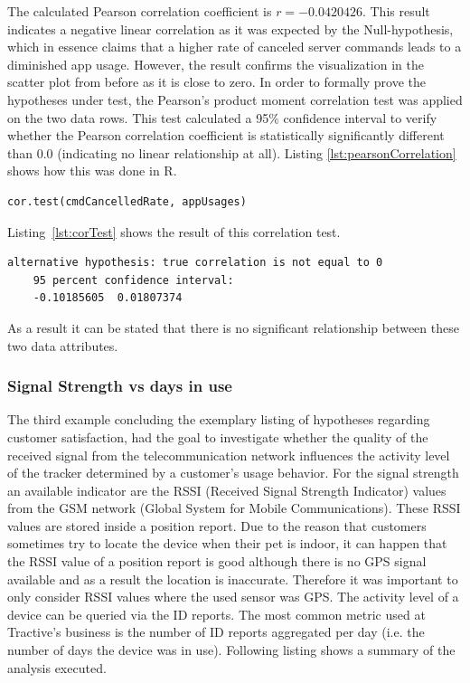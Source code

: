 \begin{enumerate}
	The calculated Pearson correlation coefficient is $r = -0.0420426$. 
	This result indicates a negative linear correlation as it was expected by the Null-hypothesis, which in essence claims that a higher rate of canceled server commands leads to a diminished app usage. However, the result confirms the visualization in the scatter plot from before as it is close to zero.
	In order to formally prove the hypotheses under test, the Pearson's product moment correlation test was applied on the two data rows. This test calculated a 95\% confidence interval to verify whether the Pearson correlation coefficient is statistically significantly different than $0.0$ (indicating no linear relationship at all). Listing \ref{lst:pearsonCorrelation} shows how this was done in R. 
	
	\begin{lstlisting}[caption={Pearson correlation test in R}, label={lst:pearsonCorrelation}]
	cor.test(cmdCancelledRate, appUsages)
	\end{lstlisting}
	
	Listing~\ref{lst:corTest} shows the result of this correlation test.
	
	\begin{lstlisting}[caption={Result of correlation test}, label={lst:corTest}]
	alternative hypothesis: true correlation is not equal to 0
	95 percent confidence interval:
	-0.10185605  0.01807374
	\end{lstlisting}
	
	As a result it can be stated that there is no significant relationship between these two data attributes. 
\end{enumerate}

\subsubsection{Signal Strength vs days in use}
The third example concluding the exemplary listing of hypotheses regarding customer satisfaction, had the goal to investigate whether the quality of the received signal from the telecommunication network influences the activity level of the tracker determined by a customer's usage behavior. For the signal strength an available indicator are the RSSI (Received Signal Strength Indicator) values from the GSM network (Global System for Mobile Communications). These RSSI values are stored inside a position report. Due to the reason that customers sometimes try to locate the device when their pet is indoor, it can happen that the RSSI value of a position report is good although there is no GPS signal available and as a result the location is inaccurate. Therefore it was important to only consider RSSI values where the used sensor was GPS. The activity level of a device can be queried via the ID reports. The most common metric used at Tractive's business is the number of ID reports aggregated per day (i.e. the number of days the device was in use). Following listing shows a summary of the analysis executed. 


